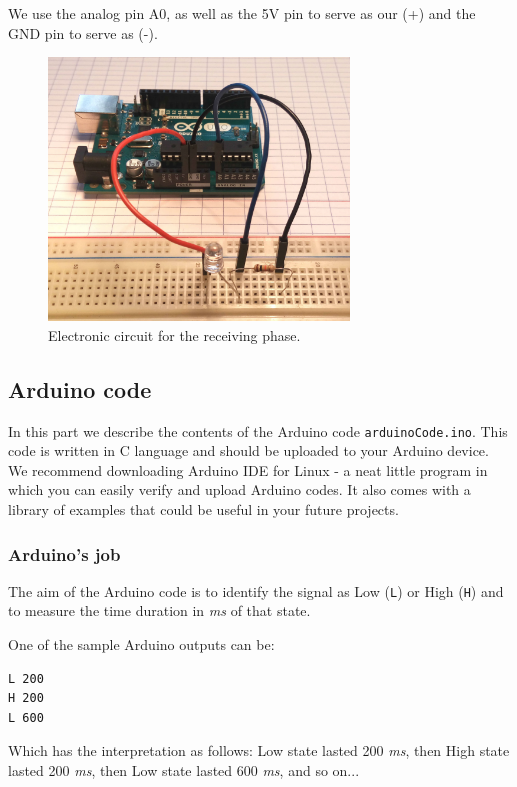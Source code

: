 \documentclass[12pt]{report}
\begin{document}
We use the analog pin A0, as well as the 5V pin to serve as our (+) and the GND pin to serve as (-).

\begin{figure}[H]
\centering\includegraphics[width=8cm]{receive_circuit}
\caption{Electronic circuit for the receiving phase.}				
\label{fig:receiving_circuit}
\end{figure}




\subsection{Arduino code}

In this part we describe the contents of the Arduino code \verb|arduinoCode.ino|. This code is written in C language and should be uploaded to your Arduino device. We recommend downloading Arduino IDE for Linux - a neat little program in which you can easily verify and upload Arduino codes. It also comes with a library of examples that could be useful in your future projects.

\subsubsection{Arduino's job}

The aim of the Arduino code is to identify the signal as Low (\verb|L|) or High (\verb|H|) and to measure the time duration in \textit{ms} of that state.

One of the sample Arduino outputs can be:

\begin{snugshade}
\begin{verbatim}
L 200
H 200
L 600
\end{verbatim}
\end{snugshade}

Which has the interpretation as follows: Low state lasted 200 \textit{ms}, then High state lasted 200 \textit{ms}, then Low state lasted 600 \textit{ms}, and so on...
\end{document}
